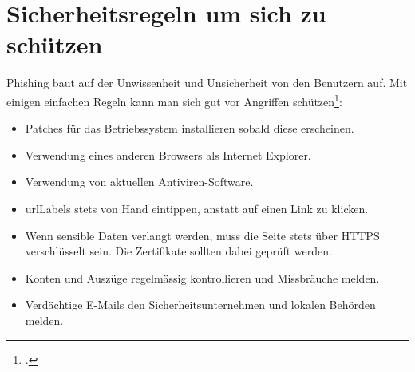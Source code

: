 \section{Sicherheitsregeln um sich zu schützen}
Phishing baut auf der Unwissenheit und Unsicherheit von den Benutzern auf. Mit einigen einfachen Regeln kann man sich gut vor Angriffen schützen\footcite{Was_ist_Phishinig_2015-05-23}:
\begin{itemize}
\item Patches für das Betriebssystem installieren sobald diese erscheinen.
\item Verwendung eines anderen Browsers als Internet Explorer.
\item Verwendung von aktuellen Antiviren-Software. 
\item \Glspl{urlLabel} stets von Hand eintippen, anstatt auf einen Link zu klicken.
\item Wenn sensible Daten verlangt werden, muss die Seite stets über HTTPS verschlüsselt sein. Die Zertifikate sollten dabei geprüft werden.
\item Konten und Auszüge regelmässig kontrollieren und Missbräuche melden.
\item Verdächtige E-Mails den Sicherheitsunternehmen und lokalen Behörden melden.
\end{itemize}
